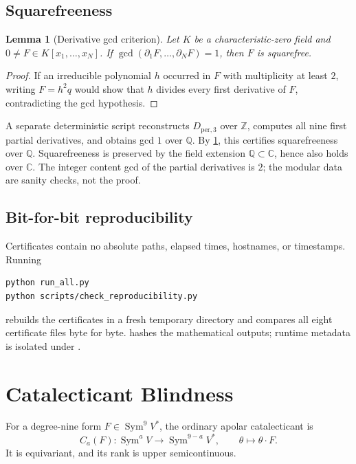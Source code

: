 \documentclass[11pt]{article}
\newtheorem{lemma}[theorem]{Lemma}
\theoremstyle{definition}
\theoremstyle{remark}
\newcommand{\C}{\mathbb C}
\newcommand{\Q}{\mathbb Q}
\newcommand{\Sym}{\operatorname{Sym}}
\begin{document}
\subsection{Squarefreeness}

\begin{lemma}[Derivative gcd criterion]\label{lem:squarefree}
Let $K$ be a characteristic-zero field and $0\ne F\in K[x_1,\ldots,x_N]$.
If $\gcd(\partial_1F,\ldots,\partial_NF)=1$, then $F$ is squarefree.
\end{lemma}
\begin{proof}
If an irreducible polynomial $h$ occurred in $F$ with multiplicity at least
$2$, writing $F=h^2q$ would show that $h$ divides every first derivative of
$F$, contradicting the gcd hypothesis.
\end{proof}

A separate deterministic script reconstructs $D_{\mathrm{per},3}$ over
$\mathbb Z$, computes all nine first partial derivatives, and obtains gcd $1$
over $\Q$.  By \cref{lem:squarefree}, this certifies squarefreeness over $\Q$.
Squarefreeness is preserved by the field extension $\Q\subset\C$, hence also
holds over $\C$.  The integer content gcd of the partial derivatives is $2$;
the modular data are sanity checks, not the proof.

\subsection{Bit-for-bit reproducibility}

Certificates contain no absolute paths, elapsed times, hostnames, or timestamps.
Running
\begin{lstlisting}[language=bash]
python run_all.py
python scripts/check_reproducibility.py
\end{lstlisting}
rebuilds the certificates in a fresh temporary directory and compares all eight
certificate files byte for byte.   hashes the
mathematical outputs; runtime metadata is isolated under .

\section{Catalecticant Blindness}

For a degree-nine form $F\in\Sym^9V^*$, the ordinary apolar catalecticant is
\[
C_a(F):\Sym^aV\longrightarrow\Sym^{9-a}V^*,\qquad
\theta\longmapsto\theta\cdot F.
\]
It is equivariant, and its rank is upper semicontinuous.
\end{document}
